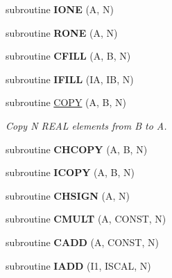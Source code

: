 \begin{CompactItemize}
\item 
\hypertarget{mat1_8F_cf3c8c9043deae813d399922bf3020f8}{
subroutine \textbf{IONE} (A, N)}
\label{mat1_8F_cf3c8c9043deae813d399922bf3020f8}

\item 
\hypertarget{mat1_8F_3233531960fc620c98c4baef9c4d4e51}{
subroutine \textbf{RONE} (A, N)}
\label{mat1_8F_3233531960fc620c98c4baef9c4d4e51}

\item 
\hypertarget{mat1_8F_30415b7f3e87a16f6aea9007fbd4e64d}{
subroutine \textbf{CFILL} (A, B, N)}
\label{mat1_8F_30415b7f3e87a16f6aea9007fbd4e64d}

\item 
\hypertarget{mat1_8F_2604748937175f7a1e5db38c5b42db2d}{
subroutine \textbf{IFILL} (IA, IB, N)}
\label{mat1_8F_2604748937175f7a1e5db38c5b42db2d}

\item 
subroutine \hyperlink{mat1_8F_1a5a579737d4fee8077fac949517f1d3}{COPY} (A, B, N)
\begin{CompactList}\small\item\em Copy N REAL elements from B to A. \item\end{CompactList}\item 
\hypertarget{mat1_8F_696bfac8e32b077e5c8bfa09f9b7f43b}{
subroutine \textbf{CHCOPY} (A, B, N)}
\label{mat1_8F_696bfac8e32b077e5c8bfa09f9b7f43b}

\item 
\hypertarget{mat1_8F_d3f4d7c3eea89a3b6d26b4bd170e1c98}{
subroutine \textbf{ICOPY} (A, B, N)}
\label{mat1_8F_d3f4d7c3eea89a3b6d26b4bd170e1c98}

\item 
\hypertarget{mat1_8F_def1e9b6b512938ce99ed09446d963c8}{
subroutine \textbf{CHSIGN} (A, N)}
\label{mat1_8F_def1e9b6b512938ce99ed09446d963c8}

\item 
\hypertarget{mat1_8F_57f46bef1590cc2df674f8ab20d74edd}{
subroutine \textbf{CMULT} (A, CONST, N)}
\label{mat1_8F_57f46bef1590cc2df674f8ab20d74edd}

\item 
\hypertarget{mat1_8F_b45e07e88d46662ef1f6d07967fbf1ca}{
subroutine \textbf{CADD} (A, CONST, N)}
\label{mat1_8F_b45e07e88d46662ef1f6d07967fbf1ca}

\item 
\hypertarget{mat1_8F_2701340f4eb775539fb6f039402ae48a}{
subroutine \textbf{IADD} (I1, ISCAL, N)}
\label{mat1_8F_2701340f4eb775539fb6f039402ae48a}


\end{CompactItemize}
